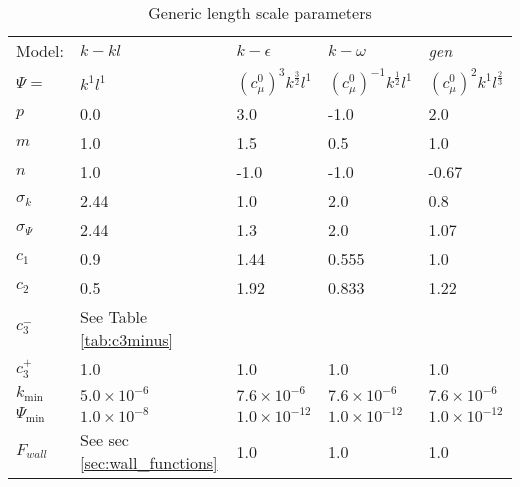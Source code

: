 \begin{table}[b]
\begin{center}
\begin{tabular}{lllll}\hline
Model: & $k-kl$   & $k-\epsilon$                  & $k-\omega$                       & \emph{gen}       \\
$\Psi=$& $k^1l^1$ & $\left(c_\mu^0\right)^3k^\frac{3}{2}l^1$ & $\left(c_\mu^0\right)^{-1}k^\frac{1}{2}l^1$ & $\left(c_\mu^0\right)^2k^1l^\frac{2}{3}$  \\ \hline
$p$                   & 0.0            & 3.0          & -1.0         & 2.0          \\
$m$                   & 1.0            & 1.5          &  0.5         & 1.0          \\
$n$                   & 1.0            & -1.0         & -1.0         & -0.67        \\
$\sigma_k$            & 2.44           & 1.0          & 2.0          & 0.8          \\
$\sigma_\Psi$         & 2.44           & 1.3          & 2.0          & 1.07         \\
$c_1$                 & 0.9            & 1.44         & 0.555        & 1.0          \\
$c_2$                 & 0.5            & 1.92         & 0.833        & 1.22         \\
$c_3^-$               & See Table \ref{tab:c3minus}\\
$c_3^+$               & 1.0            & 1.0          & 1.0          & 1.0          \\
$k_{\mathrm{min}}$    & $5.0\times10^{-6}$    & $7.6\times10^{-6}$  & $7.6\times10^{-6}$  & $7.6\times10^{-6}$  \\
$\Psi_{\mathrm{min}}$ & $1.0\times10^{-8}$    & $1.0\times10^{-12}$ & $1.0\times10^{-12}$ & $1.0\times10^{-12}$ \\
$F_{wall}$            & See sec \ref{sec:wall_functions} & 1.0 & 1.0 & 1.0 \\
\end{tabular}
\end{center}
\caption{Generic length scale parameters}
\label{tab:glsparams}
\end{table}

